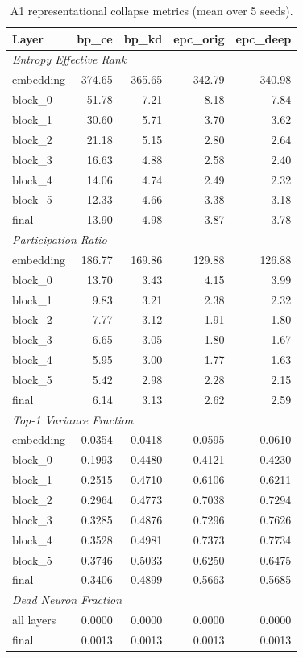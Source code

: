 \documentclass[11pt,a4paper]{article}
\begin{document}
\begin{table}[h]
\centering
\begin{tabular}{lrrrr}
\toprule
\textbf{Layer} & \textbf{bp\_ce} & \textbf{bp\_kd} & \textbf{epc\_orig} & \textbf{epc\_deep} \\
\midrule
\multicolumn{5}{l}{\textit{Entropy Effective Rank}} \\
\midrule
embedding & 374.65 & 365.65 & 342.79 & 340.98 \\
block\_0 & 51.78 & 7.21 & 8.18 & 7.84 \\
block\_1 & 30.60 & 5.71 & 3.70 & 3.62 \\
block\_2 & 21.18 & 5.15 & 2.80 & 2.64 \\
block\_3 & 16.63 & 4.88 & 2.58 & 2.40 \\
block\_4 & 14.06 & 4.74 & 2.49 & 2.32 \\
block\_5 & 12.33 & 4.66 & 3.38 & 3.18 \\
final & 13.90 & 4.98 & 3.87 & 3.78 \\
\midrule
\multicolumn{5}{l}{\textit{Participation Ratio}} \\
\midrule
embedding & 186.77 & 169.86 & 129.88 & 126.88 \\
block\_0 & 13.70 & 3.43 & 4.15 & 3.99 \\
block\_1 & 9.83 & 3.21 & 2.38 & 2.32 \\
block\_2 & 7.77 & 3.12 & 1.91 & 1.80 \\
block\_3 & 6.65 & 3.05 & 1.80 & 1.67 \\
block\_4 & 5.95 & 3.00 & 1.77 & 1.63 \\
block\_5 & 5.42 & 2.98 & 2.28 & 2.15 \\
final & 6.14 & 3.13 & 2.62 & 2.59 \\
\midrule
\multicolumn{5}{l}{\textit{Top-1 Variance Fraction}} \\
\midrule
embedding & 0.0354 & 0.0418 & 0.0595 & 0.0610 \\
block\_0 & 0.1993 & 0.4480 & 0.4121 & 0.4230 \\
block\_1 & 0.2515 & 0.4710 & 0.6106 & 0.6211 \\
block\_2 & 0.2964 & 0.4773 & 0.7038 & 0.7294 \\
block\_3 & 0.3285 & 0.4876 & 0.7296 & 0.7626 \\
block\_4 & 0.3528 & 0.4981 & 0.7373 & 0.7734 \\
block\_5 & 0.3746 & 0.5033 & 0.6250 & 0.6475 \\
final & 0.3406 & 0.4899 & 0.5663 & 0.5685 \\
\midrule
\multicolumn{5}{l}{\textit{Dead Neuron Fraction}} \\
\midrule
all layers & 0.0000 & 0.0000 & 0.0000 & 0.0000 \\
final & 0.0013 & 0.0013 & 0.0013 & 0.0013 \\
\bottomrule
\end{tabular}
\caption{A1 representational collapse metrics (mean over 5 seeds).}
\label{tab:a1-collapse}
\end{table}
\end{document}
